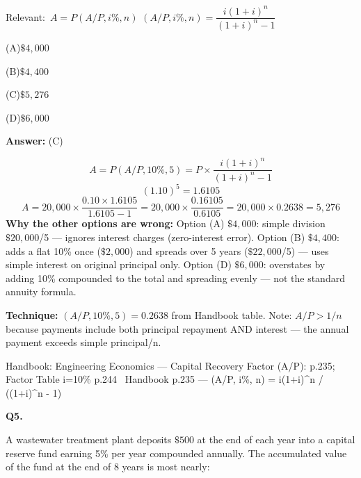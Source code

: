 \documentclass[11pt]{article}
\newcommand{\correct}[1]{\textbf{#1}\;{\color{accent}$\checkmark$}}
\newcommand{\optline}[2]{\par\noindent\hspace{1.2em}(#1)\hspace{0.6em}#2}
\begin{document}
{\small\color{soft}Relevant:}\ $A = P(A/P, i\%, n)$ \quad $(A/P, i\%, n) = \dfrac{i(1+i)^n}{(1+i)^n - 1}$\par\vspace{3pt}
\optline{A}{$\$4{,}000$}
\optline{B}{$\$4{,}400$}
\optline{C}{\correct{$\$5{,}276$}}
\optline{D}{$\$6{,}000$}
\par\vspace{3pt}
\vspace{2pt}\par\noindent\colorbox{boxbg}{\parbox{\dimexpr\linewidth-2\fboxsep\relax}{%
\vspace{2pt}\textbf{Answer:} (C)\par\vspace{2pt}
{\small \[A = P(A/P, 10\%, 5) = P \times \frac{i(1+i)^n}{(1+i)^n - 1}\]
\[(1.10)^5 = 1.6105\]
\[A = 20{,}000 \times \frac{0.10 \times 1.6105}{1.6105 - 1} = 20{,}000 \times \frac{0.16105}{0.6105} = 20{,}000 \times 0.2638 = 5{,}276\]
\textbf{Why the other options are wrong:} Option (A) $\$4{,}000$: simple division $\$20{,}000$/5 --- ignores interest charges (zero-interest error). Option (B) $\$4{,}400$: adds a flat 10\% once ($\$2{,}000$) and spreads over 5 years ($\$22{,}000$/5) --- uses simple interest on original principal only. Option (D) $\$6{,}000$: overstates by adding 10\% compounded to the total and spreading evenly --- not the standard annuity formula.\par
\textbf{Technique:} $(A/P, 10\%, 5) = 0.2638$ from Handbook table. Note: $A/P > 1/n$ because payments include both principal repayment AND interest --- the annual payment exceeds simple principal/n.\par}\par\vspace{2pt}
{\footnotesize\color{soft}Handbook: Engineering Economics --- Capital Recovery Factor (A/P): p.235; Factor Table i=10\% p.244 \textbullet\ Handbook p.235 --- (A/P, i\%, n) = i(1+i)\textasciicircum{}n / ((1+i)\textasciicircum{}n - 1)}\vspace{2pt}
}}
\vspace{9pt}
\filbreak
\textbf{\color{accent}Q5.}\par\vspace{2pt}
A wastewater treatment plant deposits $\$500$ at the end of each year into a capital reserve fund earning 5\% per year compounded annually. The accumulated value of the fund at the end of 8 years is most nearly:\par\par\vspace{3pt}
\end{document}
